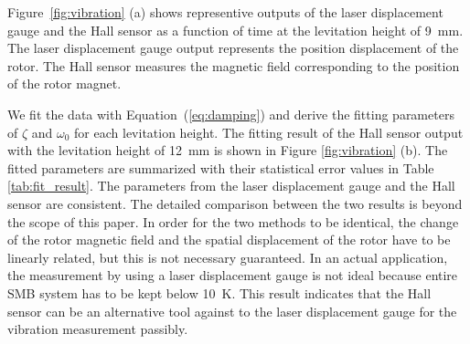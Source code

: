 \documentclass[a4paper,11pt]{jpconf}
\begin{document}
Figure~\ref{fig:vibration} (a) shows representive outputs of the laser displacement gauge and the Hall sensor as a function of time at the levitation height of 9~mm.
The laser displacement gauge output represents the position displacement of the rotor.
The Hall sensor measures the magnetic field corresponding to the position of the rotor magnet.

We fit the data with Equation~(\ref{eq:damping}) and derive the fitting parameters of $\zeta$ and $\omega_{0}$ for each levitation height.
The fitting result of the Hall sensor output with the levitation height of 12~mm is shown in Figure \ref{fig:vibration} (b).
The fitted parameters are summarized with their statistical error values in Table \ref{tab:fit_result}.
The parameters from the laser displacement gauge and the Hall sensor are consistent.
The detailed comparison between the two results is beyond the scope of this paper.
In order for the two methods to be identical, the change of the rotor magnetic field and the spatial displacement of the rotor have to be linearly related, but this is not necessary guaranteed.
In an actual application, the measurement by using a laser displacement gauge is not ideal because entire SMB system has to be kept below 10~K.
This result indicates that the Hall sensor can be an alternative tool against to the laser displacement gauge for the vibration measurement passibly.
\end{document}
